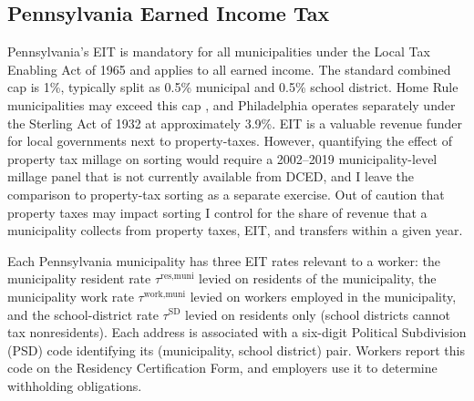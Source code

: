 \documentclass[12pt]{article}
\begin{document}
\subsection{Pennsylvania Earned Income Tax}
\label{subsec:pennsylvania}

Pennsylvania's EIT is mandatory for all municipalities under the
Local Tax Enabling Act of 1965 \citep[Act 511;][]{paAct511_1965} and applies to all earned income. The standard combined cap is 1\%, typically split as
0.5\% municipal and 0.5\% school district. Home Rule municipalities
may exceed this cap \citep{paHomeRule}, and Philadelphia operates
separately under the Sterling Act of 1932
\citep{paSterlingAct_1932} at approximately 3.9\%. EIT is a valuable revenue funder for local governments next to property-taxes. However, quantifying the effect of property tax millage on sorting would
require a 2002--2019 municipality-level millage panel that is not currently
available from DCED, and I leave the comparison to property-tax
sorting as a separate exercise. Out of caution that property taxes may impact sorting I control for the share of revenue that a municipality collects from property taxes, EIT, and transfers within a given year.

Each Pennsylvania municipality has three EIT rates relevant to a
worker:
%
the municipality resident rate $\tau^{\text{res,muni}}$ levied on residents of the municipality, the municipality work rate $\tau^{\text{work,muni}}$ levied on workers employed in the municipality, and the school-district rate $\tau^{\text{SD}}$ levied on residents only (school districts cannot tax nonresidents).
%
Each address is associated with a six-digit Political Subdivision (PSD)
code identifying its (municipality, school district) pair. Workers report this
code on the Residency Certification Form, and employers use it to
determine withholding obligations.
\end{document}
